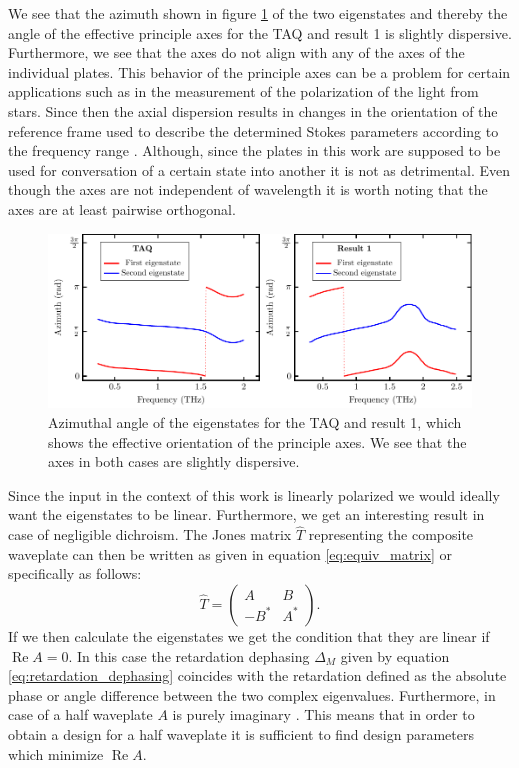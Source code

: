 We see that the azimuth shown in figure \ref{fig:cl4_eigenstate_azimuths} of the two eigenstates and thereby the angle of the effective principle axes for the TAQ and result 1 is slightly dispersive. Furthermore, we see that the axes do not align with any of the axes of the individual plates. This behavior of the principle axes can be a problem for certain applications such as in the measurement of the polarization of the light from stars. Since then the axial dispersion results in changes in the orientation of the reference frame used to describe the determined Stokes parameters according to the frequency range \cite{Clarke2004, Bailey2019}. Although, since the plates in this work are supposed to be used for conversation of a certain state into another it is not as detrimental. Even though the axes are not independent of wavelength it is worth noting that the axes are at least pairwise orthogonal.

\begin{figure}[H]
    \centering
    \includegraphics[scale=0.75]{images/results/plots/ceramic/eigenstate_azimuths.pdf}
    \caption{Azimuthal angle of the eigenstates for the TAQ and result 1, which shows the effective orientation of the principle axes. We see that the axes in both cases are slightly dispersive.}
    \label{fig:cl4_eigenstate_azimuths}
\end{figure}

Since the input in the context of this work is linearly polarized we would ideally want the eigenstates to be linear. Furthermore, we get an interesting result in case of negligible dichroism. The Jones matrix $\hat{T}$ representing the composite waveplate can then be written as given in equation \ref{eq:equiv_matrix} or specifically as follows:
\begin{equation}
    \hat{T} = 
    \begin{pmatrix} 
    A & B \\
    -B^* & A^*
    \end{pmatrix}.
\end{equation}
If we then calculate the eigenstates we get the condition that they are linear if $\operatorname{Re}A=0$. In this case the retardation dephasing $\Delta_M$ given by equation \ref{eq:retardation_dephasing} coincides with the retardation defined as the absolute phase or angle difference between the two complex eigenvalues. Furthermore, in case of a half waveplate $A$ is purely imaginary \cite{McIntyre1968}. This means that in order to obtain a design for a half waveplate it is sufficient to find design parameters which minimize $\operatorname{Re}A$.

